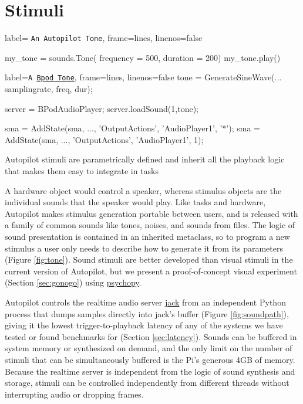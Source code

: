 \documentclass[nohyper, justified, notitlepage, marginals=raggedright,twoside=false,debug]{tufte-autopilot}
\begin{document}
\section{Stimuli}
\label{sec:stim}


\begin{marginfigure}[0.45cm]
\begin{pythoncode*}{
label= \texttt{An Autopilot Tone},
frame=lines,
linenos=false}

my_tone = sounds.Tone(
    frequency = 500,
    duration  = 200)
my_tone.play()
\end{pythoncode*}
\vspace{-18pt}
\begin{matlabcode*}{
label=\texttt{A \href{https://github.com/sanworks/Bpod_Gen2/blob/master/Examples/Protocols/AnalogSound2AFC/AnalogSound2AFC.m}{Bpod Tone}},
frame=lines,
linenos=false}
tone = GenerateSineWave(...
samplingrate, freq, dur);

server = BPodAudioPlayer;
server.loadSound(1,tone);

sma = AddState(sma, ...,
'OutputActions', 
{'AudioPlayer1', '*'});
sma = AddState(sma, ...,
'OutputActions',
{'AudioPlayer1', 1});
\end{matlabcode*}
\caption{Autopilot stimuli are parametrically defined and inherit all the playback logic that makes them easy to integrate in tasks}
\label{fig:tone}
\end{marginfigure}

A hardware object would control a speaker, whereas stimulus objects are the individual sounds that the speaker would play. Like tasks and hardware, Autopilot makes stimulus generation portable between users, and is released with a family of common sounds like tones, noises, and sounds from files. The logic of sound presentation is contained in an inherited metaclass, so to program a new stimulus a user only needs to describe how to generate it from its parameters (Figure \ref{fig:tone}).  Sound stimuli are better developed than visual stimuli in the current version of Autopilot, but we present a proof-of-concept visual experiment (Section \ref{sec:gonogo}) using \href{https://www.psychopy.org/}{psychopy}\citep{peircePsychoPy2ExperimentsBehavior2019}.

Autopilot controls the realtime audio server \href{http://jackaudio.org/}{jack} from an independent Python process that dumps samples directly into jack's buffer (Figure \ref{fig:soundpath}), giving it the lowest trigger-to-playback latency of any of the systems we have tested or found benchmarks for (Section \ref{sec:latency}). Sounds can be buffered in system memory or synthesized on demand, and the only limit on the number of stimuli that can be simultaneously buffered is the Pi's generous 4GB of memory. Because the realtime server is independent from the logic of sound synthesis and storage, stimuli can be controlled independently from different threads without interrupting audio or dropping frames.
\end{document}
